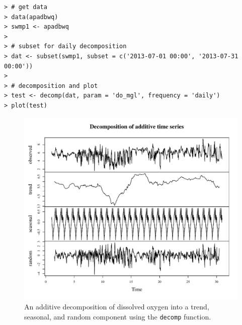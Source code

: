 \documentclass[10pt,letterpaper]{article}\usepackage[]{graphicx}\usepackage[]{color}
\makeatletter
\def\maxwidth{ %
  \ifdim\Gin@nat@width>\linewidth
    \linewidth
  \else
    \Gin@nat@width
  \fi
}
\newenvironment{kframe}{%
 \def\at@end@of@kframe{}%
 \ifinner\ifhmode%
  \def\at@end@of@kframe{\end{minipage}}%
  \begin{minipage}{\columnwidth}%
 \fi\fi%
 \def\FrameCommand##1{\hskip\@totalleftmargin \hskip-\fboxsep
 \colorbox{shadecolor}{##1}\hskip-\fboxsep
     \hskip-\linewidth \hskip-\@totalleftmargin \hskip\columnwidth}%
 \MakeFramed {\advance\hsize-\width
   \@totalleftmargin\z@ \linewidth\hsize
   \@setminipage}}%
 {\par\unskip\endMakeFramed%
 \at@end@of@kframe}
\newenvironment{knitrout}{}{} %
\makeatother
\begin{document}
\begin{knitrout}\small
{}\color{fgcolor}\begin{kframe}
\begin{verbatim}
> # get data
> data(apadbwq)
> swmp1 <- apadbwq
> 
> # subset for daily decomposition
> dat <- subset(swmp1, subset = c('2013-07-01 00:00', '2013-07-31 00:00'))
> 
> # decomposition and plot
> test <- decomp(dat, param = 'do_mgl', frequency = 'daily')
> plot(test)
\end{verbatim}
\end{kframe}\begin{figure}[!ht]


{\centering \includegraphics[width=\maxwidth]{figure/decomp_ex1} 

}

\caption[An additive decomposition of dissolved oxygen into a trend, seasonal, and random component using the \texttt{decomp} function]{An additive decomposition of dissolved oxygen into a trend, seasonal, and random component using the \texttt{decomp} function.\label{fig:decomp_ex1}}
\end{figure}


\end{knitrout}
\end{document}
